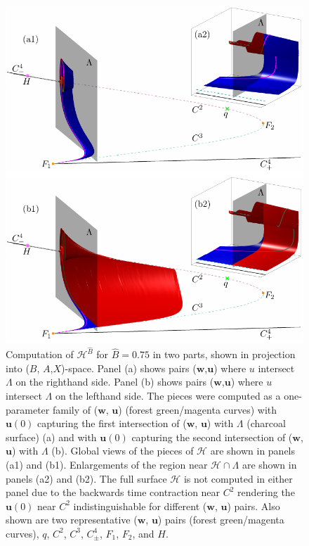 \documentclass{ws-ijbc}
\begin{document}
\begin{figure}[H]
\centering
\includegraphics[]{./figures/MKMO_14.pdf}
\caption{Computation of $\mathscr{H}^{\widehat{B}}$ for $\widehat{B}=0.75$ in two parts, shown in projection into ($B$, $A$,$X$)-space.  Panel (a) shows pairs ($\mathbf{w}$,$\mathbf{u}$) where $u$ intersect $\Lambda$ on the righthand side.  Panel (b) shows pairs ($\mathbf{w}$,$\mathbf{u}$) where $u$ intersect $\Lambda$ on the lefthand side.  The pieces were computed as a one-parameter family of ($\mathbf{w}$, $\mathbf{u}$) (forest green/magenta curves) with $\mathbf{u}(0)$ capturing the first intersection of ($\mathbf{w}$, $\mathbf{u}$) with $\Lambda$ (charcoal surface) (a) and with $\mathbf{u}(0)$ capturing the second intersection of ($\mathbf{w}$, $\mathbf{u}$) with $\Lambda$ (b).  Global views of the pieces of $\mathscr{H}$ are shown in panels (a1) and (b1).  Enlargements of the region near $\mathscr{H} \cap \Lambda$ are shown in panels (a2) and (b2).  The full surface $\mathscr{H}$ is not computed in either panel due to the backwards time contraction near $C^2$ rendering the $\mathbf{u}(0)$ near $C^2$ indistinguishable for different ($\mathbf{w}$, $\mathbf{u}$) pairs.  Also shown are two representative ($\mathbf{w}$, $\mathbf{u}$) pairs (forest green/magenta curves), $q$, $C^2$, $C^3$, $C^4_\pm$, $F_1$, $F_2$, and $H$.}
\label{figure_14}
\end{figure}
\end{document}

